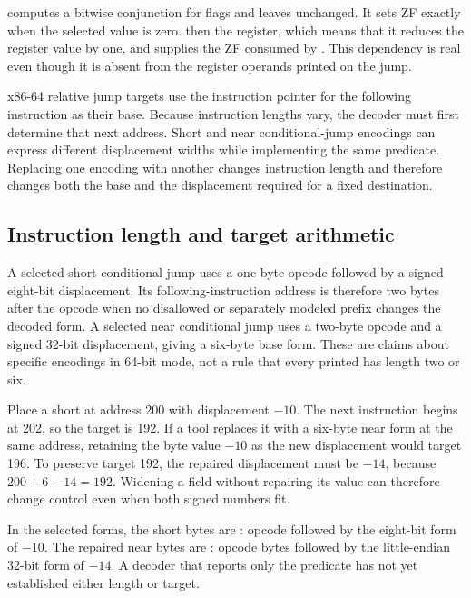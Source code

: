  computes a bitwise conjunction for flags and leaves
 unchanged. It sets ZF exactly when the selected value is zero.
 then  the register, which means that it reduces
the register value by one, and supplies the ZF consumed by
. This dependency is real even though it is absent from the
register operands printed on the jump.

x86-64 relative jump targets use the instruction pointer for the following
instruction as their base. Because instruction lengths vary, the decoder must
first determine that next address. Short and near conditional-jump encodings
can express different displacement widths while implementing the same
predicate. Replacing one encoding with another changes instruction length and
therefore changes both the base and the displacement required for a fixed
destination.

\subsection{Instruction length and target arithmetic}

A selected short conditional jump uses a one-byte opcode followed by a signed
eight-bit displacement. Its following-instruction address is therefore two
bytes after the opcode when no disallowed or separately modeled prefix changes
the decoded form. A selected near conditional jump uses a two-byte opcode and
a signed 32-bit displacement, giving a six-byte base form. These are claims
about specific encodings in 64-bit mode, not a rule that every printed
 has length two or six.

Place a short  at address 200 with displacement \(-10\). The next
instruction begins at 202, so the target is 192. If a tool replaces it with a
six-byte near form at the same address, retaining the byte value \(-10\) as
the new displacement would target 196. To preserve target 192, the repaired
displacement must be \(-14\), because \(200+6-14=192\). Widening a field
without repairing its value can therefore change control even when both signed
numbers fit.

In the selected forms, the short bytes are : opcode 
followed by the eight-bit form of \(-10\). The repaired near bytes are
: opcode bytes  followed by the
little-endian 32-bit form of \(-14\). A decoder that reports only the
predicate has not yet established either length or target.

